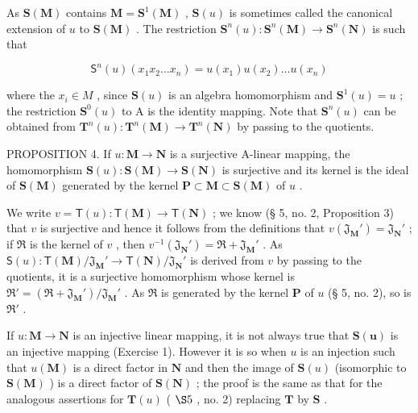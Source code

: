 As \(\mathbf{S}(\mathbf{M})\) contains \(\mathbf{M} = \mathbf{S}^1 (\mathbf{M})\) , \(\mathbf{S}(u)\) is sometimes called the canonical extension of \(u\) to \(\mathbf{S}(\mathbf{M})\) . The restriction \(\mathbf{S}^n (u): \mathbf{S}^n (\mathbf{M}) \to \mathbf{S}^n (\mathbf{N})\) is such that

\[
\mathsf {S} ^ {n} (u) \left(x _ {1} x _ {2} \dots x _ {n}\right) = u \left(x _ {1}\right) u \left(x _ {2}\right) \dots u \left(x _ {n}\right)
\]

where the \(x_{i} \in M\) , since \(\mathbf{S}(u)\) is an algebra homomorphism and \(\mathbf{S}^{1}(u) = u\) ; the restriction \(\mathbf{S}^{0}(u)\) to A is the identity mapping. Note that \(\mathbf{S}^{n}(u)\) can be obtained from \(\mathbf{T}^{n}(u): \mathbf{T}^{n}(\mathbf{M}) \to \mathbf{T}^{n}(\mathbf{N})\) by passing to the quotients.

PROPOSITION 4. If \(u: \mathbf{M} \to \mathbf{N}\) is a surjective A-linear mapping, the homomorphism \(\mathbf{S}(u): \mathbf{S}(\mathbf{M}) \to \mathbf{S}(\mathbf{N})\) is surjective and its kernel is the ideal of \(\mathbf{S}(\mathbf{M})\) generated by the kernel \(\mathbf{P} \subset \mathbf{M} \subset \mathbf{S}(\mathbf{M})\) of \(u\) .

We write \(v = \mathsf{T}(u) \colon \mathsf{T}(\mathbf{M}) \to \mathsf{T}(\mathbf{N})\) ; we know (§ 5, no. 2, Proposition 3) that \(v\) is surjective and hence it follows from the definitions that \(v(\mathfrak{J}_{\mathbf{M}}') = \mathfrak{J}_{\mathbf{N}}'\) ; if \(\Re\) is the kernel of \(v\) , then \(v^{-1}(\mathfrak{J}_{\mathbf{N}}') = \Re + \mathfrak{J}_{\mathbf{M}}'\) . As \(\mathsf{S}(u) \colon \mathsf{T}(\mathbf{M}) / \mathfrak{J}_{\mathbf{M}}' \to \mathsf{T}(\mathbf{N}) / \mathfrak{J}_{\mathbf{N}}'\) is derived from \(v\) by passing to the quotients, it is a surjective homomorphism whose kernel is \(\Re' = (\Re + \mathfrak{J}_{\mathbf{M}}') / \mathfrak{J}_{\mathbf{M}}'\) . As \(\Re\) is generated by the kernel \(\mathbf{P}\) of \(u\) (§ 5, no. 2), so is \(\Re'\) .

If \(u: \mathbf{M} \to \mathbf{N}\) is an injective linear mapping, it is not always true that \(\mathbf{S}(\mathbf{u})\) is an injective mapping (Exercise 1). However it is so when \(u\) is an injection such that \(u(\mathbf{M})\) is a direct factor in \(\mathbf{N}\) and then the image of \(\mathbf{S}(u)\) (isomorphic to \(\mathbf{S}(\mathbf{M})\) ) is a direct factor of \(\mathbf{S}(\mathbf{N})\) ; the proof is the same as that for the analogous assertions for \(\mathbf{T}(u)\) ( \(\S 5\) , no. 2) replacing \(\mathbf{T}\) by \(\mathbf{S}\) .

